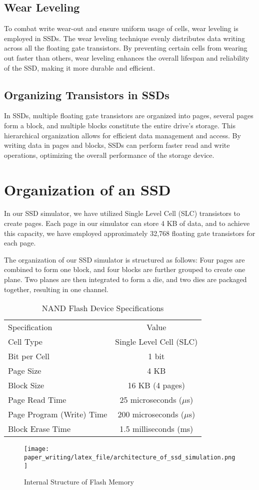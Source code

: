 \documentclass[conference]{/home/habib/Desktop/flash_ssd_simulator_web/paper_writing/latex_file/IEEEtran}
\begin{document}
\subsection{Wear Leveling}
To combat write wear-out and ensure uniform usage of cells, wear leveling is employed in SSDs. The wear leveling technique evenly distributes data writing across all the floating gate transistors. By preventing certain cells from wearing out faster than others, wear leveling enhances the overall lifespan and reliability of the SSD, making it more durable and efficient.

\subsection{Organizing Transistors in SSDs}
In SSDs, multiple floating gate transistors are organized into pages, several pages form a block, and multiple blocks constitute the entire drive's storage. This hierarchical organization allows for efficient data management and access. By writing data in pages and blocks, SSDs can perform faster read and write operations, optimizing the overall performance of the storage device.


\section{Organization of an SSD}
In our SSD simulator, we have utilized Single Level Cell (SLC) transistors to create pages. Each page in our simulator can store 4 KB of data, and to achieve this capacity, we have employed approximately 32,768 floating gate transistors for each page.

The organization of our SSD simulator is structured as follows: Four pages are combined to form one block, and four blocks are further grouped to create one plane. Two planes are then integrated to form a die, and two dies are packaged together, resulting in one channel.

\begin{table}[htbp]
    \centering
    \caption{NAND Flash Device Specifications}
    \begin{tabular}{l c}
        Specification & Value \\
        Cell Type & Single Level Cell (SLC) \\
        Bit per Cell & 1 bit \\
        Page Size & 4 KB \\
        Block Size & 16 KB (4 pages) \\
        Page Read Time & 25 microseconds ($\mu$s) \\
        Page Program (Write) Time & 200 microseconds ($\mu$s) \\
        Block Erase Time & 1.5 milliseconds (ms) \\
    \end{tabular}
\end{table}
\begin{figure}[h]
    \centering
    \texttt{[image: paper\_writing/latex\_file/architecture\_of\_ssd\_simulation.png]}
    \caption{Internal Structure of Flash Memory}
    \label{fig:architecture_of_ssd_simulation}
\end{figure}
\end{document}
